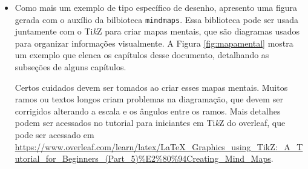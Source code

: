 \begin{itemize}
Algumas rotinas chamadas por este pacote, principalmente as 3D, podem ser demoradas, acarretando em aumento razoável do tempo de compilação do seu documento. Deste modo, analise se esta é a melhor opção ou se você deveria gerar os gráficos 3D fora do \LaTeX{} e importá-los.

O manual desse pacote pode acessado em \url{http://mirrors.ctan.org/graphics/pgf/contrib/pgfplots/doc/pgfplots.pdf} \parencite{pgfplots}, e muitos exemplos podem ser encontrados na Internet.

\item Como mais um exemplo de tipo específico de desenho, apresento uma figura gerada com o auxílio da bilbioteca \texttt{mindmaps}. Essa biblioteca pode ser usada juntamente com o Ti\textit{k}Z para criar mapas mentais, que são diagramas usados para organizar informações visualmente. A Figura \ref{fig:mapamental} mostra um exemplo que elenca os capítulos desse documento, detalhando as subseções de alguns capítulos.

Certos cuidados devem ser tomados ao criar esses mapas mentais. Muitos ramos ou textos longos criam problemas na diagramação, que devem ser corrigidos alterando a escala e os ângulos entre os ramos. Mais detalhes podem ser acessados no tutorial para iniciantes em Ti\textit{k}Z do \gls{overleaf}, que pode ser acessado em \url{https://www.overleaf.com/learn/latex/LaTeX_Graphics_using_TikZ:_A_Tutorial_for_Beginners_(Part_5)\%E2\%80\%94Creating_Mind_Maps}.

\begin{figure}[htb]
	\begin{center}
	\begin{tikzpicture}[mindmap, scale=0.9, grow cyclic, every node/.style=concept, concept color=orange!40, 
	level 1/.append style={level distance=5cm,sibling angle=45},
	level 2/.append style={level distance=3cm,sibling angle=40}]


\end{tikzpicture}
\end{center}
\end{figure}
\end{itemize}
